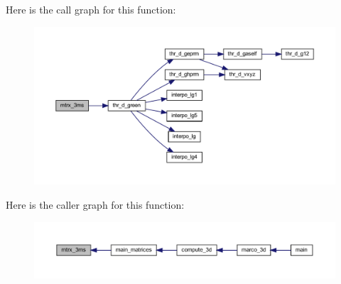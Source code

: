 Here is the call graph for this function\+:
\nopagebreak
\begin{figure}[H]
\begin{center}
\leavevmode
\includegraphics[width=350pt]{Marco_8f90_ae8f6d0ec346f13094a0e373aab8dd10d_cgraph}
\end{center}
\end{figure}
Here is the caller graph for this function\+:
\nopagebreak
\begin{figure}[H]
\begin{center}
\leavevmode
\includegraphics[width=350pt]{Marco_8f90_ae8f6d0ec346f13094a0e373aab8dd10d_icgraph}
\end{center}
\end{figure}
\mbox{\label{Marco_8f90_ab80bc274f8a08000a99dd5a512ad0729}} 
